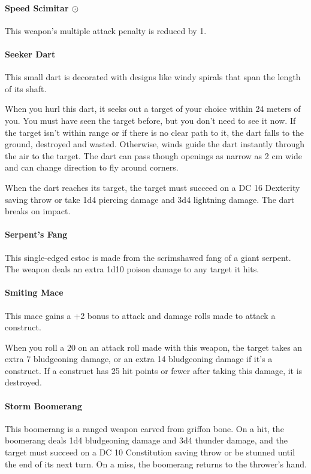     \paragraph{Speed Scimitar $\odot$}
        This weapon's multiple attack penalty is reduced by 1.
    \paragraph{Seeker Dart}
        This small dart is decorated with designs like windy spirals that span the length of its shaft.

        When you hurl this dart, it seeks out a target of your choice within 24 meters of you.
        You must have seen the target before, but you don't need to see it now.
        If the target isn't within range or if there is no clear path to it, the dart falls to the ground, destroyed and wasted.
        Otherwise, winds guide the dart instantly through the air to the target.
        The dart can pass though openings as narrow as 2 cm wide and can change direction to fly around corners.

        When the dart reaches its target, the target must succeed on a DC 16 Dexterity saving throw or take 1d4 piercing damage and 3d4 lightning damage.
        The dart breaks on impact.
    \paragraph{Serpent's Fang}
        This single-edged estoc is made from the scrimshawed fang of a giant serpent.
        The weapon deals an extra 1d10 poison damage to any target it hits.
    \paragraph{Smiting Mace}
        This mace gains a +2 bonus to attack and damage rolls made to attack a construct.

        When you roll a 20 on an attack roll made with this weapon, the target takes an extra 7 bludgeoning damage, or an extra 14 bludgeoning damage if it's a construct.
        If a construct has 25 hit points or fewer after taking this damage, it is destroyed.
    \paragraph{Storm Boomerang}
        This boomerang is a ranged weapon carved from griffon bone.
        On a hit, the boomerang deals 1d4 bludgeoning damage and 3d4 thunder damage, and the target must succeed on a DC 10 Constitution saving throw or be stunned until the end of its next turn.
        On a miss, the boomerang returns to the thrower's hand.

